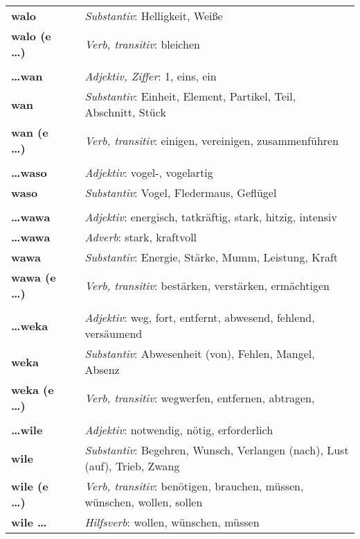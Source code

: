 \begin{supertabular}{p{2,5cm}|ll}
\textbf{walo} && \textit{Substantiv}: Helligkeit, Weiße \\ 
\textbf{walo (e \dots)} && \textit{Verb, transitiv}: bleichen \\ 
 && \\ %
\textbf{\dots wan} && \textit{Adjektiv, Ziffer}: 1, eins, ein \\ 
\textbf{wan} && \textit{Substantiv}: Einheit, Element, Partikel, Teil, Abschnitt, Stück \\ 
\textbf{wan (e \dots)} && \textit{Verb, transitiv}: einigen, vereinigen, zusammenführen \\ 
 && \\ %
\textbf{\dots waso} && \textit{Adjektiv}: vogel-, vogelartig \\ 
\textbf{waso} && \textit{Substantiv}: Vogel, Fledermaus, Geflügel \\ 
 && \\ %
\textbf{\dots wawa} && \textit{Adjektiv}: energisch, tatkräftig, stark, hitzig, intensiv \\ 
\textbf{\dots wawa} && \textit{Adverb}: stark, kraftvoll \\ 
\textbf{wawa} && \textit{Substantiv}: Energie, Stärke, Mumm, Leistung, Kraft \\ 
\textbf{wawa (e \dots)} && \textit{Verb, transitiv}: bestärken, verstärken, ermächtigen \\ 
 && \\ %
\textbf{\dots weka} && \textit{Adjektiv}: weg, fort, entfernt, abwesend, fehlend, versäumend \\ 
\textbf{weka} && \textit{Substantiv}: Abwesenheit (von), Fehlen, Mangel, Absenz \\ 
\textbf{weka (e \dots)} && \textit{Verb, transitiv}: wegwerfen, entfernen, abtragen,  \\ 
 && \\ %
\textbf{\dots wile} && \textit{Adjektiv}: notwendig,  nötig, erforderlich \\ 
\textbf{wile} && \textit{Substantiv}: Begehren, Wunsch, Verlangen (nach), Lust (auf), Trieb, Zwang \\ 
\textbf{wile (e \dots)} && \textit{Verb, transitiv}: benötigen, brauchen, müssen, wünschen, wollen, sollen \\ 
\textbf{wile \dots} && \textit{Hilfsverb}: wollen, wünschen, müssen \\ 
\end{supertabular} \\
%
